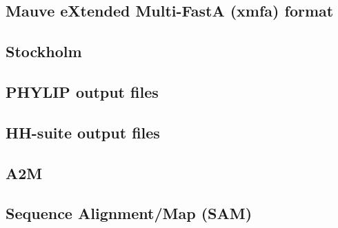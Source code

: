 \subsection{Mauve eXtended Multi-FastA (xmfa) format}
\label{subsec:align_mauve}

\subsection{Stockholm}
\label{subsec:align_stockholm}

\subsection{PHYLIP output files}
\label{subsec:align_phylip}

\subsection{HH-suite output files}
\label{subsec:align_hhr}

\subsection{A2M}
\label{subsec:align_a2m}

\subsection{Sequence Alignment/Map (SAM)}
\label{subseq:align_sam}

